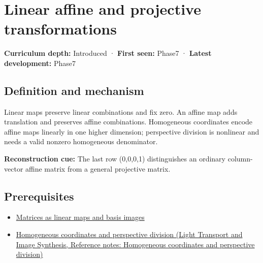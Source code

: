 \hypertarget{appendix-0bf0ca73f735}{}\label{referencestart:appendix-0bf0ca73f735}
\section{Linear affine and projective transformations}\label{appendix-0bf0ca73f735-linear-affine-and-projective-transformations}

\hypertarget{appendix-0bf0ca73f735-linear-affine-and-projective-transformations}{}

\textbf{Curriculum depth:} Introduced · \textbf{First seen:} Phase7 · \textbf{Latest development:} Phase7

\begin{allmightroledefinition}

\subsection{Definition and mechanism}\label{appendix-0bf0ca73f735-definition-and-mechanism}

\hypertarget{appendix-0bf0ca73f735-definition-and-mechanism}{}

Linear maps preserve linear combinations and fix zero. An affine map adds translation and preserves affine combinations. Homogeneous coordinates encode affine maps linearly in one higher dimension; perspective division is nonlinear and needs a valid nonzero homogeneous denominator.

\end{allmightroledefinition}

\textbf{Reconstruction cue:} The last row (0,0,0,1) distinguishes an ordinary column-vector affine matrix from a general projective matrix.

\subsection{Prerequisites}\label{appendix-0bf0ca73f735-prerequisites}

\hypertarget{appendix-0bf0ca73f735-prerequisites}{}

\begin{itemize}
\tightlist
\item
  \hyperref[appendix-bd39c3bf5d64]{Matrices as linear maps and basis images}
\item
  \href{../04-Light-Transport-and-Image-Synthesis/main.pdf\#nameddest=appendix-cb3b26862282}{Homogeneous coordinates and perspective division (Light Transport and Image Synthesis, Reference notes: Homogeneous coordinates and perspective division)}
\end{itemize}

